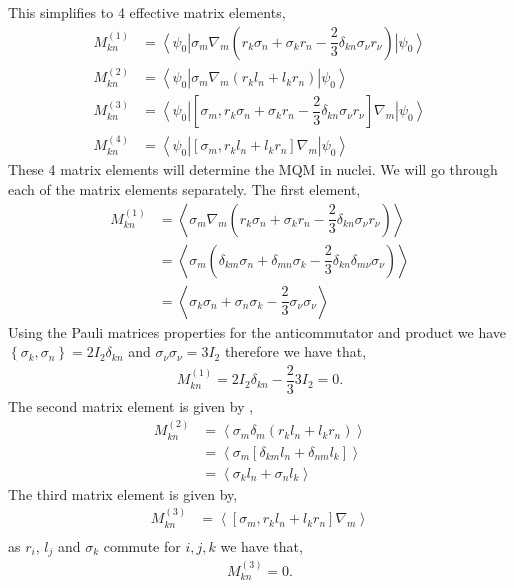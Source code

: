 \documentclass[10pt,a4paper, twoside]{report}
\begin{document}
This simplifies to 4 effective matrix elements,
\begin{align*}
M^{(1)}_{kn} &= \left<\psi_0\right|\sigma_m\nabla_m\left(r_k\sigma_n + \sigma_kr_n - \dfrac{2}{3}\delta_{kn}\sigma_{\nu}r_{\nu}\right)\left|\psi_0\right> \\
M^{(2)}_{kn} &= \left<\psi_0\right|\sigma_m\nabla_m\left(r_kl_n + l_kr_n\right)\left|\psi_0\right> \\
M^{(3)}_{kn} &=  \left<\psi_0\right|\left[\sigma_m , r_k\sigma_n + \sigma_kr_n -\dfrac{2}{3}\delta_{kn}\sigma_{\nu}r_{\nu}\right]\nabla_m\left|\psi_0\right> \\
M^{(4)}_{kn} &= \left<\psi_0\right|\left[\sigma_m, r_kl_n + l_kr_n\right]\nabla_m\left|\psi_0\right>
\end{align*}
These 4 matrix elements will determine the MQM in nuclei. We will go through each of the matrix elements separately. The first element,
\begin{align*}
M^{(1)}_{kn} &= \left<\sigma_m\nabla_m\left(r_k\sigma_n + \sigma_kr_n - \dfrac{2}{3}\delta_{kn}\sigma_\nu r_\nu\right)\right> \\
&= \left<\sigma_m\left(\delta_{km}\sigma_{n} + \delta_{mn}\sigma_k - \dfrac{2}{3}\delta_{kn}\delta_{m\nu}\sigma_{\nu}\right)\right> \\
&= \left<\sigma_k\sigma_n + \sigma_n\sigma_k - \dfrac{2}{3}\sigma_{\nu}\sigma_{\nu} \right>
\end{align*}
Using the Pauli matrices properties for the anticommutator and product we have $\left\{\sigma_k, \sigma_n\right\} = 2I_{2}\delta_{kn}$ and $\sigma_{\nu}\sigma_{\nu} = 3I_{2}$ therefore we have that,
\begin{align*}
M^{(1)}_{kn} = 2I_{2}\delta_{kn} - \dfrac{2}{3} 3I_{2} = 0.
\end{align*}
The second matrix element is given by ,
\begin{align*}
M^{(2)}_{kn} &= \left<\sigma_m\delta_m\left(r_kl_n + l_kr_n\right)\right> \\
 &= \left<\sigma_m \left[\delta_{km}l_n + \delta_{nm}l_k\right]\right> \\
&= \left<\sigma_k l_n + \sigma_nl_k\right>
\end{align*}
The third matrix element is given by,
\begin{align*}
M^{(3)}_{kn} &= \left<\left[\sigma_m, r_kl_n + l_kr_n\right]\nabla_m\right> \\
\end{align*}
as $r_i$, $l_{j}$ and $\sigma_k$ commute for $i,j,k$ we have that,
\begin{align*}
M^{(3)}_{kn} = 0.
\end{align*}
\end{document}
